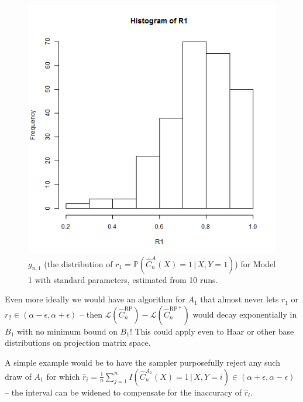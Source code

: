 \documentclass{amsart}
\newcommand\crpnhat{\hat{C}_{n}^{\mathrm{RP}}}
\newcommand\crpnhatstar{\hat{C}_{n}^{\mathrm{RP*}}}
\newcommand\risk{\mathcal{L}}
\begin{document}
\begin{figure}[h]
\begin{centering}
\includegraphics[scale=0.5]{r1_dist}
\par\end{centering}

\caption{$g_{n,1}$ (the distribution of $r_{1}=\mathbb{P}\left(\hat{C}_{n}^{A}(X)=1\,|\,X,Y=1\right)$)
for Model 1 with standard parameters, estimated from 10 runs.}


\label{fig:r1-dist}
\end{figure}

Even more ideally we would have an algorithm for $A_{1}$ that almost never lets $r_{1}$ or $r_{2}\in(\alpha-\epsilon,\alpha+\epsilon)$
-- then $\risk\left(\crpnhat\right)-\risk\left(\crpnhatstar\right)$ would decay exponentially in $B_{1}$ with no minimum bound on $B_{1}$! This could apply even to Haar or other base distributions on projection matrix space.

A simple example would be to have the sampler purposefully reject any such draw of $A_1$ for which $\hat r_i = \frac1n\sum_{j=1}^n I(\hat C_n^{A_1}(X)=1 \,|\, X,Y=i) \in (\alpha+\epsilon, \alpha-\epsilon)$ -- the interval can be widened to compensate for the inaccuracy of $\hat r_i$.
\end{document}
